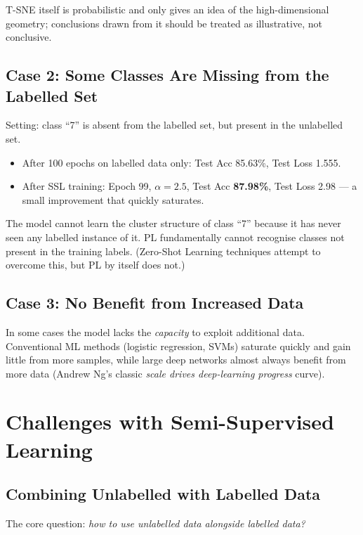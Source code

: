 \documentclass[11pt,a4paper]{article}
\theoremstyle{definition}
\theoremstyle{plain}
\theoremstyle{remark}
\begin{document}
T-SNE itself is probabilistic and only gives an idea of the high-dimensional geometry; conclusions drawn from it should be treated as illustrative, not conclusive.

\subsection{Case 2: Some Classes Are Missing from the Labelled Set}

Setting: class ``7'' is absent from the labelled set, but present in the unlabelled set.

\begin{itemize}
    \item After 100 epochs on labelled data only: Test Acc 85.63\%, Test Loss 1.555.
    \item After SSL training: Epoch 99, $\alpha = 2.5$, Test Acc \textbf{87.98\%}, Test Loss 2.98 --- a small improvement that quickly saturates.
\end{itemize}

The model cannot learn the cluster structure of class ``7'' because it has never seen any labelled instance of it. PL fundamentally cannot recognise classes not present in the training labels. (Zero-Shot Learning techniques attempt to overcome this, but PL by itself does not.)

\subsection{Case 3: No Benefit from Increased Data}

In some cases the model lacks the \emph{capacity} to exploit additional data. Conventional ML methods (logistic regression, SVMs) saturate quickly and gain little from more samples, while large deep networks almost always benefit from more data (Andrew Ng's classic \emph{scale drives deep-learning progress} curve).


\section{Challenges with Semi-Supervised Learning}

\subsection{Combining Unlabelled with Labelled Data}

The core question: \emph{how to use unlabelled data alongside labelled data?}
\end{document}
